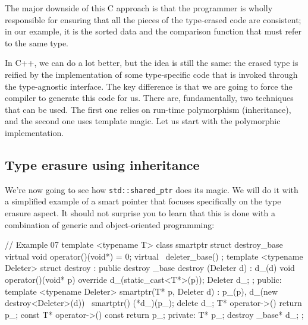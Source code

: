 The major downside of this C approach is that the programmer is wholly responsible for ensuring that all the pieces of the type-erased code are consistent; in our example, it is the sorted data and the comparison function that must refer to the same type.

In C++, we can do a lot better, but the idea is still the same: the erased type is reified by the implementation of some type-specific code that is invoked through the type-agnostic interface. The key difference is that we are going to force the compiler to generate this code for us. There are, fundamentally, two techniques that can be used. The first one relies on run-time polymorphism (inheritance), and the second one uses template magic. Let us start with the polymorphic implementation.

\subsection{Type erasure using inheritance}

We're now going to see how \texttt{std::shared\_ptr} does its magic. We will do it with a simplified example of a smart pointer that focuses specifically on the type erasure aspect. It should not surprise you to learn that this is done with a combination of generic and object-oriented programming:

\begin{code}
// Example 07
template <typename T> class smartptr {
  struct destroy_base {
    virtual void operator()(void*) = 0;
    virtual ~deleter_base() {}
  };
  template <typename Deleter>
  struct destroy : public destroy _base {
    destroy (Deleter d) : d_(d) {}
    void operator()(void* p) override {
      d_(static_cast<T*>(p));
    }
    Deleter d_;
  };
  public:
  template <typename Deleter> smartptr(T* p, Deleter d) :
    p_(p), d_(new destroy<Deleter>(d)) {}
  ~smartptr() { (*d_)(p_); delete d_; }
  T* operator->() { return p_; }
  const T* operator->() const { return p_; }
  private:
  T* p_;
  destroy _base* d_;
};
\end{code}

